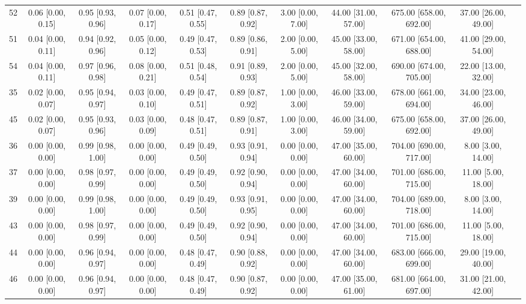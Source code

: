 \documentclass[8pt]{article}
\begin{document}
\begin{center}
\begin{footnotesize}
\begin{longtable}{|ccccccccccc|}
 52 &  0.06 [0.00, 0.15] &  0.95 [0.93, 0.96] &  0.07 [0.00, 0.17] &  0.51 [0.47, 0.55] &  0.89 [0.87, 0.92] &     3.00 [0.00, 7.00] &  44.00 [31.00, 57.00] &  675.00 [658.00, 692.00] &     37.00 [26.00, 49.00] \\
 51 &  0.04 [0.00, 0.11] &  0.94 [0.92, 0.96] &  0.05 [0.00, 0.12] &  0.49 [0.47, 0.53] &  0.89 [0.86, 0.91] &     2.00 [0.00, 5.00] &  45.00 [33.00, 58.00] &  671.00 [654.00, 688.00] &     41.00 [29.00, 54.00] \\
 54 &  0.04 [0.00, 0.11] &  0.97 [0.96, 0.98] &  0.08 [0.00, 0.21] &  0.51 [0.48, 0.54] &  0.91 [0.89, 0.93] &     2.00 [0.00, 5.00] &  45.00 [32.00, 58.00] &  690.00 [674.00, 705.00] &     22.00 [13.00, 32.00] \\
 35 &  0.02 [0.00, 0.07] &  0.95 [0.94, 0.97] &  0.03 [0.00, 0.10] &  0.49 [0.47, 0.51] &  0.89 [0.87, 0.92] &     1.00 [0.00, 3.00] &  46.00 [33.00, 59.00] &  678.00 [661.00, 694.00] &     34.00 [23.00, 46.00] \\
 45 &  0.02 [0.00, 0.07] &  0.95 [0.93, 0.96] &  0.03 [0.00, 0.09] &  0.48 [0.47, 0.51] &  0.89 [0.87, 0.91] &     1.00 [0.00, 3.00] &  46.00 [34.00, 59.00] &  675.00 [658.00, 692.00] &     37.00 [26.00, 49.00] \\
 36 &  0.00 [0.00, 0.00] &  0.99 [0.98, 1.00] &  0.00 [0.00, 0.00] &  0.49 [0.49, 0.50] &  0.93 [0.91, 0.94] &     0.00 [0.00, 0.00] &  47.00 [35.00, 60.00] &  704.00 [690.00, 717.00] &       8.00 [3.00, 14.00] \\
 37 &  0.00 [0.00, 0.00] &  0.98 [0.97, 0.99] &  0.00 [0.00, 0.00] &  0.49 [0.49, 0.50] &  0.92 [0.90, 0.94] &     0.00 [0.00, 0.00] &  47.00 [34.00, 60.00] &  701.00 [686.00, 715.00] &      11.00 [5.00, 18.00] \\
 39 &  0.00 [0.00, 0.00] &  0.99 [0.98, 1.00] &  0.00 [0.00, 0.00] &  0.49 [0.49, 0.50] &  0.93 [0.91, 0.95] &     0.00 [0.00, 0.00] &  47.00 [34.00, 60.00] &  704.00 [689.00, 718.00] &       8.00 [3.00, 14.00] \\
 43 &  0.00 [0.00, 0.00] &  0.98 [0.97, 0.99] &  0.00 [0.00, 0.00] &  0.49 [0.49, 0.50] &  0.92 [0.90, 0.94] &     0.00 [0.00, 0.00] &  47.00 [34.00, 60.00] &  701.00 [686.00, 715.00] &      11.00 [5.00, 18.00] \\
 44 &  0.00 [0.00, 0.00] &  0.96 [0.94, 0.97] &  0.00 [0.00, 0.00] &  0.48 [0.47, 0.49] &  0.90 [0.88, 0.92] &     0.00 [0.00, 0.00] &  47.00 [34.00, 60.00] &  683.00 [666.00, 699.00] &     29.00 [19.00, 40.00] \\
 46 &  0.00 [0.00, 0.00] &  0.96 [0.94, 0.97] &  0.00 [0.00, 0.00] &  0.48 [0.47, 0.49] &  0.90 [0.87, 0.92] &     0.00 [0.00, 0.00] &  47.00 [35.00, 61.00] &  681.00 [664.00, 697.00] &     31.00 [21.00, 42.00] \\

\end{longtable}
\end{footnotesize}
\end{center}
\end{document}
